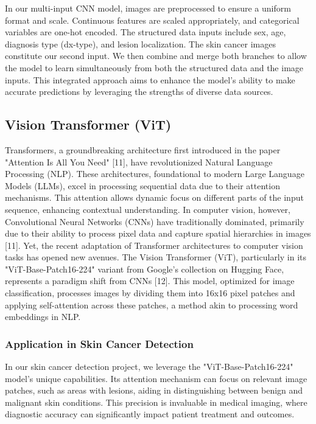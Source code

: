 \documentclass[conference]{IEEEtran}
\begin{document}
In our multi-input CNN model, images are preprocessed to ensure a uniform format and scale. Continuous features are scaled appropriately, and categorical variables are one-hot encoded. The structured data inputs include sex, age, diagnosis type (dx-type), and lesion localization. The skin cancer images constitute our second input. We then combine and merge both branches to allow the model to learn simultaneously from both the structured data and the image inputs. This integrated approach aims to enhance the model's ability to make accurate predictions by leveraging the strengths of diverse data sources.
\subsection{Vision Transformer (ViT)}

Transformers, a groundbreaking architecture first introduced in the paper "Attention Is All You Need" [11], have revolutionized Natural Language Processing (NLP). These architectures, foundational to modern Large Language Models (LLMs), excel in processing sequential data due to their attention mechanisms. This attention allows dynamic focus on different parts of the input sequence, enhancing contextual understanding. In computer vision, however, Convolutional Neural Networks (CNNs) have traditionally dominated, primarily due to their ability to process pixel data and capture spatial hierarchies in images [11]. Yet, the recent adaptation of Transformer architectures to computer vision tasks has opened new avenues. The Vision Transformer (ViT), particularly in its "ViT-Base-Patch16-224" variant from Google's collection on Hugging Face, represents a paradigm shift from CNNs [12]. This model, optimized for image classification, processes images by dividing them into 16x16 pixel patches and applying self-attention across these patches, a method akin to processing word embeddings in NLP.

\subsubsection{Application in Skin Cancer Detection}
In our skin cancer detection project, we leverage the "ViT-Base-Patch16-224" model's unique capabilities. Its attention mechanism can focus on relevant image patches, such as areas with lesions, aiding in distinguishing between benign and malignant skin conditions. This precision is invaluable in medical imaging, where diagnostic accuracy can significantly impact patient treatment and outcomes.
\end{document}
